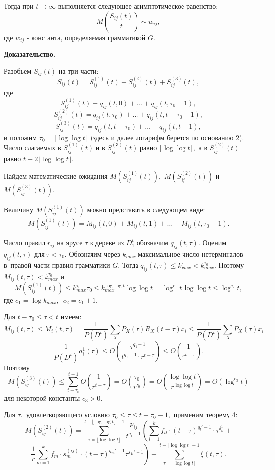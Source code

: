 \documentclass[%
11pt,a4paper]{article}
\begin{document}
{{{{Тогда при $t \rightarrow \infty $ выполняется следующее асимптотическое равенство:
$$
M\left(\frac{S_{ij}(t)}{t}\right) \sim w_{ij},
$$
где $w_{ij}$ - константа, определяемая грамматикой $G.$}
\medskip

{\bf Доказательство.}

Разобьем $S_{ij}(t)$ на три части:
$$
S_{ij}(t)=S_{ij}^{(1)}(t)+S_{ij}^{(2)}(t)+S_{ij}^{(3)}(t),
$$
где
$$
S_{ij}^{(1)}(t)=q_{ij}(t,0)+\ldots+q_{ij}(t,\tau_0-1),
$$
$$
S_{ij}^{(2)}(t)=q_{ij}(t,\tau_0)+\ldots+q_{ij}(t,t-\tau_0-1),
$$
$$
S_{ij}^{(3)}(t)=q_{ij}(t,t-\tau_0)+\ldots+q_{ij}(t,t-1),
$$
и положим $\tau_0=\lfloor \log\log t \rfloor$ (здесь и далее логарифм
берется по основанию 2).
Число слагаемых в $S_{ij}^{(1)}(t)$ и в $S_{ij}^{(3)}(t)$ равно
$\lfloor \log\log t \rfloor,$ а в $S_{ij}^{(2)}(t)$ равно
$t-2 \lfloor \log\log t \rfloor.$

Найдем математические ожидания $M\left(S_{ij}^{(1)}(t)\right),$
$M\left(S_{ij}^{(2)}(t)\right)$ и
$M\left(S_{ij}^{(3)}(t)\right).$

Величину $M\left(S_{ij}^{(1)}(t)\right)$ можно представить в следующем виде:
$$
M\left(S_{ij}^{(1)}(t)\right)=M_{ij}(t,0)+M_{ij}(t,1)+\ldots +
M_{ij}(t,\tau_0-1).
$$

Число правил $r_{ij}$ на ярусе $\tau$ в дереве из $D_1^t$ обозначим $q_{ij}(t,\tau).$
Оценим $q_{ij}(t,\tau)$ для $\tau < \tau_0.$
Обозначим через $k_{max}$ максимальное число нетерминалов в~правой части правил грамматики $G.$ Тогда
$q_{ij}(t,\tau)\leq k_{max}^{\tau}< k_{max}^{\tau_0}.$
Поэтому
$
M_{ij}(t,\tau)< k_{max}^{\tau_0}
$
и
$$
M\left(S_{ij}^{(1)}(t)\right)\leq k_{max}^{\tau_0}  \tau_0\leq
k_{max}^{\log \log t}
  \log \log t=\log^{c_1} t \,  \log \log t \leq \log^{c_2} t,
$$
где $c_1=\log k_{max},$ $\, c_2=c_1+1.$

Для $t-\tau_0 \leq \tau < t$ имеем:
$$
M_{ij}(t,\tau)\leq M_{i}(t,\tau) =
\frac 1 {P(D^t)} \sum_{X} P_X(\tau)   R_X(t-\tau)   x_i \leq
\frac{1}{P(D^t)} \sum_{X} P_X(\tau)   x_i=
$$
$$
\frac{1}{P(D^t)}  a^1_{i}(\tau)\le
O\left(\frac{\tau^{q_1-1}}{t^{q_1-1}\cdot r^{t-\tau}}\right)\le O\left(\frac 1{r^{t-\tau}}\right).
$$
Поэтому
$$
M\left(S_{ij}^{(3)}(t)\right) \leq
\sum_{t-\tau_0}^{t-1} O\left(\frac{1}{r^{t-\tau}}\right)
=O\left(\frac {\tau_0}{r^{\tau_0}}\right)
=O\left(\frac {\log \log t}{r^{\log \log t}}\right)=O\left(\log ^{c_3} t\right)
$$
для некоторой константы $c_3>0.$

Для $\tau,$ удовлетворяющего условию
$\tau_0 \leq \tau \leq t-\tau_0-1,$ применим теорему 4:
$$
M\left(S_{ij}^{(2)}(t)\right)=
\sum_{\tau=\lfloor \log\log t \rfloor}^{t-\lfloor \log\log t \rfloor-1}
\frac{p_{ij}}{t^{q_1-1}} \left(\sum_{l =1}^k f_{il} \cdot (t-\tau)^{q_l'-1}\cdot \tau^{\delta_{il}^1}+ \right.
$$
$$
\left. \frac{1}{{r }} \sum_{m=1}^k f_m\cdot s_m^{(ij)}\cdot
(t-\tau)^{q_m'-1}\tau^{s_{1i}'-1}\right)+
\sum_{\tau=\lfloor \log\log t \rfloor}^{t-\lfloor \log\log t \rfloor-1} \xi(t,\tau).
$$

}}}
\end{document}
